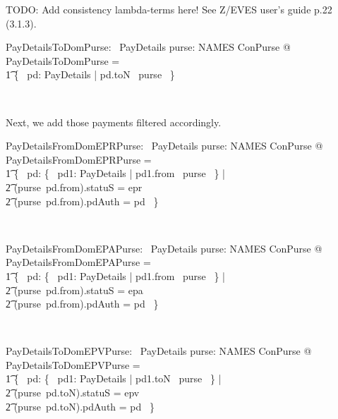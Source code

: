 TODO: Add consistency lambda-terms here! See Z/EVES user's guide p.22 (3.1.3).
\begin{LNewADef}
\begin{axdef}
   PayDetailsToDomPurse: \power~PayDetails
\where
    \forall purse: NAMES \finj ConPurse @ PayDetailsToDomPurse = \\
    \t1 \{~ pd: PayDetails | pd.toN \in \dom~purse ~\}
\end{axdef}~\end{LNewADef}
%
Next, we add those payments filtered accordingly.
%
\begin{LNewADef}
\begin{axdef}
   PayDetailsFromDomEPRPurse: \power~PayDetails
\where
    \forall purse: NAMES \finj ConPurse @ PayDetailsFromDomEPRPurse = \\
    \t1 \{~ pd: \{~ pd1: PayDetails | pd1.from \in \dom~purse ~\} | \\
        \t2 (purse~pd.from).statuS = epr \\
        \t2 \land (purse~pd.from).pdAuth = pd ~\}
\end{axdef}~\end{LNewADef}
%
\begin{LNewADef}
\begin{axdef}
   PayDetailsFromDomEPAPurse: \power~PayDetails
\where
    \forall purse: NAMES \finj ConPurse @ PayDetailsFromDomEPAPurse = \\
    \t1 \{~ pd: \{~ pd1: PayDetails | pd1.from \in \dom~purse ~\} | \\
        \t2 (purse~pd.from).statuS = epa \\
        \t2 \land (purse~pd.from).pdAuth = pd ~\}
\end{axdef}~\end{LNewADef}
%
\begin{LNewADef}
\begin{axdef}
   PayDetailsToDomEPVPurse: \power~PayDetails
\where
    \forall purse: NAMES \finj ConPurse @ PayDetailsToDomEPVPurse = \\
    \t1 \{~ pd: \{~ pd1: PayDetails | pd1.toN \in \dom~purse ~\} | \\
        \t2 (purse~pd.toN).statuS = epv \land \\
        \t2 (purse~pd.toN).pdAuth = pd ~\}
\end{axdef}~\end{LNewADef}

